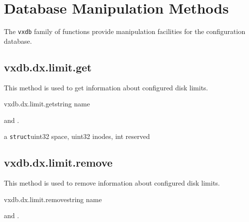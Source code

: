 \chapter{Database Manipulation Methods}
\label{ch:rpcref:vxdb}

The \texttt{vxdb} family of functions provide manipulation facilities for the
configuration database.


\section{vxdb.dx.limit.get}

This method is used to get information about configured disk limits.

\begin{rpcsynopsis}{vxdb.dx.limit.get}{string name}
\end{rpcsynopsis}

\begin{rpcaccess}
 and \rpcownerchecks.
\end{rpcaccess}

\begin{rpcreturncomplex}{a \texttt{struct}}{uint32 space, uint32 inodes,
	int reserved}
\end{rpcreturncomplex}

\rpcnoerrors


\section{vxdb.dx.limit.remove}

This method is used to remove information about configured disk limits.

\begin{rpcsynopsis}{vxdb.dx.limit.remove}{string name}
\end{rpcsynopsis}

\begin{rpcaccess}
 and \rpcownerchecks.
\end{rpcaccess}

\rpcreturnnil

